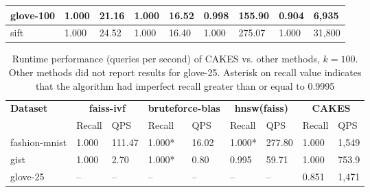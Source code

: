 \begin{table*}[!t]
\begin{center}
\begin{small}
\begin{sc}
\begin{tabular}{|l|p{1cm}|p{1cm}|p{1cm}|p{1cm}|p{1cm}|p{1cm}|p{1cm}|p{1cm}|}
    \hline
    glove-100             & 1.000 & 21.16                          & 1.000 & 16.52                                & 0.998 & 155.90                                                  & 0.904 & 6,935 \\
    \hline
    sift                  & 1.000 &  24.52                          & 1.000 & 16.40                               & 1.000 & 275.07                                                    & 1.000 & 31,800 \\
    \hline
    \end{tabular}
    \end{sc}
    \end{small}
    \end{center}
    \vskip -0.1in
    \end{table*}


\begin{table*}[!t]
    \caption{Runtime performance (queries per second) of CAKES vs. other methods, $k=100$. Other methods did not report results for glove-25. Asterisk on recall value indicates that the algorithm had imperfect recall greater than or equal to 0.9995}
    \label{table:results:ann-100}
    \vskip 0.15in
    \begin{center}
    \begin{small}
    \begin{sc}
    \begin{tabular}{|l|p{1cm}|p{1cm}|p{1cm}|p{1cm}|p{1cm}|p{1cm}|p{1cm}|p{1cm}|}
    \textbf{Dataset}  & \multicolumn{2}{|c|}{\textbf{faiss-ivf}} & \multicolumn{2}{|c|}{\textbf{bruteforce-blas}} & \multicolumn{2}{|c|}{\textbf{hnsw(faiss)}} & \multicolumn{2}{|c|}{\textbf{CAKES}} \\
    &                    Recall & QPS                           & Recall & QPS                           & Recall & QPS                                           & Recall & QPS \\
    \hline
    fashion-mnist         & 1.000 & 111.47                           & 1.000* & 16.02                                  & 1.000* & 277.80                                                    & 1.000 & 1,549 \\ 
    \hline
    gist                   & 1.000 & 2.70                           & 1.000* & 0.80                                 & 0.995 & 59.71                                                    & 1.000 & 753.9 \\
    \hline
    glove-25              & -- & --                                & -- & --                                & -- & --                                                    & 0.851 & 1,471 \\

\end{tabular}
\end{sc}
\end{small}
\end{center}
\end{table*}
